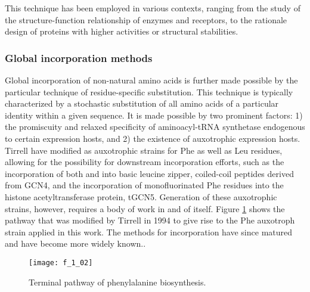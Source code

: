\begin{refsection}
This technique has been employed in various contexts, ranging from the study of
the structure-function relationship of enzymes and receptors, to the rationale
design of proteins with higher activities or structural stabilities.



\subsubsection{Global incorporation methods} 


Global incorporation of non-natural amino acids is further made possible by the
particular technique of residue-specific substitution. This technique is
typically characterized by a stochastic substitution of all amino acids of a
particular identity within a given sequence. It is made possible by two
prominent factors: 1) the promiscuity and relaxed specificity of aminoacyl-tRNA
synthetase endogenous to certain expression hosts, and 2) the existence of
auxotrophic expression hosts. Tirrell  have modified  as auxotrophic strains for Phe as well as Leu residues, allowing for the
possibility for downstream incorporation efforts, such as the incorporation of
both  and
 into basic leucine zipper, coiled-coil
peptides derived from GCN4,\cite{Son2006} and the incorporation of monofluorinated Phe
residues into the histone acetyltransferase protein,
tGCN5.\cite{Voloshchuk2009} Generation of these auxotrophic strains, however,
requires a body of work in and of itself.\cite{Yoshikawa1994,Son2006} Figure
\ref{fig:chorismate_pathway} shows the pathway that was modified by Tirrell
 in 1994 to give rise to the Phe auxotroph strain applied in this
work. The methods for incorporation have since matured and have become more
widely known.\cite{Hammill2007}.
\begin{figure}[h!] \centering \texttt{[image: f\_1\_02]}
    \caption[Terminal pathway of phenylalanine
        biosynthesis.]{Terminal pathway of phenylalanine
        biosynthesis.\cite{Yoshikawa1994}}\label{fig:chorismate_pathway} \end{figure}

\end{refsection}
